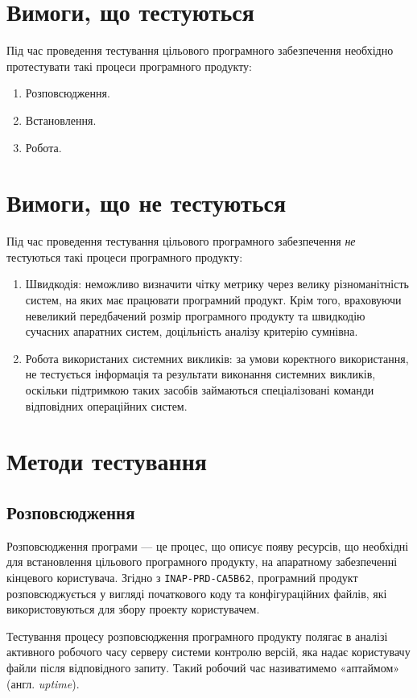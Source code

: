 \documentclass[a4paper,oneside,DIV=12,12pt]{scrartcl}
\begin{document}
    \section{Вимоги, що тестуються}
		Під час проведення тестування цільового програмного забезпечення необхідно протестувати такі процеси програмного продукту:
		\begin{enumerate}
			\item Розповсюдження.
			\item Встановлення.
			\item Робота.
		\end{enumerate}
		
    \section{Вимоги, що не тестуються}
		Під час проведення тестування цільового програмного забезпечення \emph{не} тестуються такі процеси програмного продукту:
		\begin{enumerate}
			\item Швидкодія: неможливо визначити чітку метрику через велику різноманітність систем, на яких має працювати програмний продукт. Крім того, враховуючи невеликий передбачений розмір програмного продукту та швидкодію сучасних апаратних систем, доцільність аналізу критерію сумнівна.
			\item Робота використаних системних викликів: за умови коректного використання, не тестується інформація та результати виконання системних викликів, оскільки підтримкою таких засобів займаються спеціалізовані команди відповідних операційних систем.
		\end{enumerate}
    \section{Методи тестування}
		\subsection{Розповсюдження}
			Розповсюдження програми --- це процес, що описує появу ресурсів, що необхідні для встановлення цільового програмного продукту, на апаратному забезпеченні кінцевого користувача. Згідно з \texttt{INAP-PRD-CA5B62}, програмний продукт розповсюджується у вигляді початкового коду та конфігураційних файлів, які використовуються для збору проекту користувачем.
			
			Тестування процесу розповсюдження програмного продукту полягає в аналізі активного робочого часу серверу системи контролю версій, яка надає користувачу файли після відповідного запиту. Такий робочий час називатимемо «аптаймом» (англ. \emph{uptime}).
			
\end{document}
